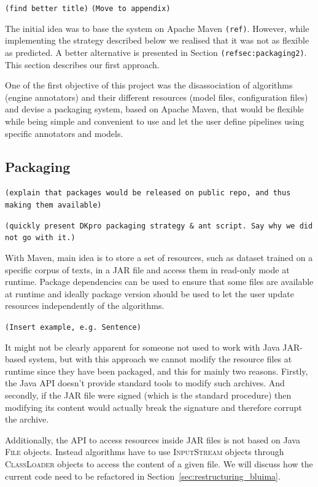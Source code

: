 \documentclass{article}
\newcommand{\ID}[1]{{\textsc{#1}}}
\newcommand{\JAR}{JAR\xspace}
\newcommand{\TODO}[1]{\texttt{\textcolor{YellowOrange}{(#1)}}} %
\begin{document}
\TODO{find better title} \TODO{Move to appendix}

The initial idea was to base the system on Apache Maven \TODO{ref}. However, while implementing the
strategy described below we realised that it was not as flexible as predicted. A better alternative
is presented in Section \TODO{ref{sec:packaging2}}. This section describes our first approach.

One of the first objective of this project was the disassociation of algorithms (engine annotators) and their different resources (model files, configuration files) and devise a packaging system, based on Apache Maven, that would be flexible while being simple and convenient to use and let the user define pipelines using specific annotators and models.

\subsection{Packaging}

\TODO{explain that packages would be released on public repo, and thus making them available}

\TODO{quickly present DKpro packaging strategy \& ant script. Say why we did not go with it.}

With Maven, main idea is to store a set of resources, such as dataset trained on a specific corpus of texts, in a \JAR file and access them in read-only mode at runtime. Package dependencies can be used to ensure that some files are available at runtime and ideally package version should be used to let the user update resources independently of the algorithms.

\TODO{Insert example, e.g. Sentence}

It might not be clearly apparent for someone not used to work with Java \JAR-based system, but with
this approach we cannot modify the resource files at runtime since they have been packaged, and this
for mainly two reasons. Firstly, the Java API doesn't provide standard tools to modify such
archives.  And secondly, if the \JAR file were signed (which is the standard procedure) then
modifying its content would actually break the signature and therefore corrupt the archive.

Additionally, the API to access resources inside \JAR files is not based on Java \ID{File} objects.
Instead algorithms have to use \ID{InputStream} objects through \ID{ClassLoader} objects to access
the content of a given file. We will discuss how the current code need to be refactored in
Section~\ref{sec:restructuring_bluima}.
\end{document}
